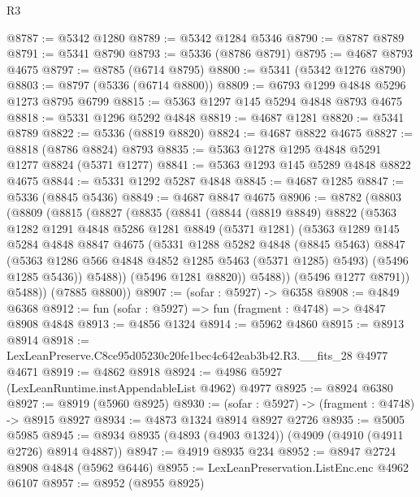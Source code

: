 \begin{lexlean}{R3}
\begin{coremodule}
@8787 := @5342 @1280
@8789 := @5342 @1284 @5346
@8790 := @8787 @8789
@8791 := @5341 @8790
@8793 := @5336 (@8786 @8791)
@8795 := @4687 @8793 @4675
@8797 := @8785 (@6714 @8795)
@8800 := @5341 (@5342 @1276 @8790)
@8803 := @8797 (@5336 (@6714 @8800))
@8809 := @6793 @1299 @4848 @5296 @1273 @8795 @6799
@8815 := @5363 @1297 @145 @5294 @4848 @8793 @4675
@8818 := @5331 @1296 @5292 @4848
@8819 := @4687 @1281
@8820 := @5341 @8789
@8822 := @5336 (@8819 @8820)
@8824 := @4687 @8822 @4675
@8827 := @8818 (@8786 @8824) @8793
@8835 := @5363 @1278 @1295 @4848 @5291 @1277 @8824 (@5371 @1277)
@8841 := @5363 @1293 @145 @5289 @4848 @8822 @4675
@8844 := @5331 @1292 @5287 @4848
@8845 := @4687 @1285
@8847 := @5336 (@8845 @5436)
@8849 := @4687 @8847 @4675
@8906 := @8782
    (@8803
      (@8809
        (@8815
          (@8827
            (@8835
              (@8841
                (@8844
                  (@8819 @8849)
                  @8822
                  (@5363
                    @1282
                    @1291
                    @4848
                    @5286
                    @1281
                    @8849
                    (@5371 @1281)
                    (@5363
                      @1289
                      @145
                      @5284
                      @4848
                      @8847
                      @4675
                      (@5331
                        @1288
                        @5282
                        @4848
                        (@8845 @5463)
                        @8847
                        (@5363 @1286 @566 @4848 @4852 @1285 @5463 (@5371 @1285) @5493)
                        (@5496 @1285 @5436))
                      @5488))
                  (@5496 @1281 @8820))
                @5488))
            (@5496 @1277 @8791))
          @5488))
      (@7885 @8800))
@8907 := (sofar : @5927) -> @6358
@8908 := @4849 @6368
@8912 := fun (sofar : @5927) => fun (fragment : @4748) => @4847 @8908 @4848
@8913 := @4856 @1324
@8914 := @5962 @4860
@8915 := @8913 @8914
@8918 := LexLeanPreserve.C8ce95d05230c20fe1bec4c642eab3b42.R3.__fits_28 @4977 @4671
@8919 := @4862 @8918
@8924 := @4986 @5927 (LexLeanRuntime.instAppendableList @4962) @4977
@8925 := @8924 @6380
@8927 := @8919 (@5960 @8925)
@8930 := (sofar : @5927) -> (fragment : @4748) -> @8915 @8927
@8934 := @4873 @1324 @8914 @8927 @2726
@8935 := @5005 @5985
@8945 := @8934 @8935 (@4893 (@4903 @1324)) (@4909 (@4910 (@4911 @2726) @8914 @4887))
@8947 := @4919 @8935 @234
@8952 := @8947 @2724 @8908 @4848 (@5962 @6446)
@8955 := LexLeanPreservation.ListEnc.enc @4962 @6107
@8957 := @8952 (@8955 @8925)

\end{coremodule}
\end{lexlean}
